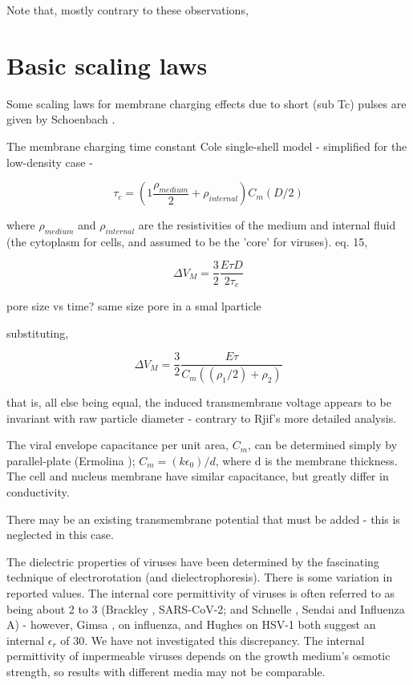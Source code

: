 \documentclass[fleqn,10pt]{article}
\begin{document}
Note that, mostly contrary to these observations, 


\cite{Nanosecond2006b} 






\section*{Basic scaling laws}


Some scaling laws for membrane charging effects due to short (sub Tc) pulses are given by Schoenbach \cite{Bioelectric2007}. 

The membrane charging time constant Cole single-shell model \cite{Ultrashort2004} - simplified for the low-density case - 

$$\tau_c = \left(1 \frac{\rho_{medium}}{2} + \rho_{internal}\right) C_m (D/2)$$

where $\rho_{medium}$ and $\rho_{internal}$ are the resistivities of the medium and internal fluid (the cytoplasm for cells, and assumed to be the 'core' for viruses). \cite{Bioelectric2007} eq. 15, 

$$\Delta V_M = \frac{3}{2}\frac{E\tau D}{2 \tau_c }$$


pore size vs time? same size pore in a smal lparticle 

substituting,

$$\Delta V_M = \frac{3}{2}\frac{E \tau}{C_m ((\rho_1/2) + \rho_2)}$$

that is, all else being equal, the induced transmembrane voltage appears to be invariant with raw particle diameter - contrary to Rjif's more detailed analysis.

The viral envelope capacitance per unit area, $C_m$, can be determined simply by parallel-plate (Ermolina \cite{Study2001}); $C_m = (k\epsilon_0) / d$, where d is the membrane thickness. The cell and nucleus membrane have similar capacitance, but greatly differ in conductivity. 

There may be an existing transmembrane potential that must be added - this is neglected in this case.

The dielectric properties of viruses have been determined by the fascinating technique of electrorotation (and dielectrophoresis). There is some variation in reported values. The internal core permittivity of viruses is often referred to as being about 2 to 3 (Brackley \cite{Electrostatic2020}, SARS-CoV-2; and Schnelle \cite{Trapping1996}, Sendai and Influenza A) - however, Gimsa \cite{New1999}, on influenza, and Hughes\cite{Dielectrophoretic2001} on HSV-1 both suggest an internal $\epsilon_r$ of 30. We have not investigated this discrepancy. The internal permittivity of impermeable viruses depends on the growth medium's osmotic strength\cite{Osmotic2003}, so results with different media may not be comparable.
\end{document}
